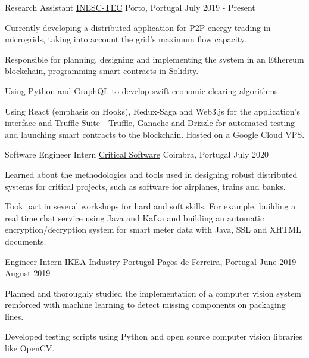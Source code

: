 
\begin{cventries}
  \cventry
    {Research Assistant} %
    {\href{https://www.inesctec.pt/en}{INESC-TEC}} %
    {Porto, Portugal} %
    {July 2019 - Present} %
    {
      \begin{cvitems} %
        \item {Currently developing a distributed application for P2P energy trading in microgrids, taking into account the grid's maximum flow capacity.}
        \item {Responsible for planning, designing and implementing the system in an Ethereum blockchain, programming smart contracts in Solidity.}
        \item {Using Python and GraphQL to develop swift economic clearing algorithms.}
        \item {Using React (emphasis on Hooks), Redux-Saga and Web3.js for the application's interface and Truffle Suite - Truffle, Ganache and Drizzle for automated testing and launching smart contracts to the blockchain. Hosted on a Google Cloud VPS.}
      \end{cvitems}
    }

  \cventry
    {Software Engineer Intern} %
    {\href{https://www.criticalsoftware.com/en}{Critical Software}} %
    {Coimbra, Portugal} %
    {July 2020} %
    {
      \begin{cvitems} %
        \item {Learned about the methodologies and tools used in designing robust distributed systems for critical projects, such as software for airplanes, trains and banks.}
        \item {Took part in several workshops for hard and soft skills. For example, building a real time chat service using Java and Kafka and building an automatic encryption/decryption system for smart meter data with Java, SSL and XHTML documents.}
      \end{cvitems}
    }

  \cventry
    {Engineer Intern} %
    {IKEA Industry Portugal} %
    {Paços de Ferreira, Portugal} %
    {June 2019 - August 2019} %
    {
      \begin{cvitems} %
        \item {Planned and thoroughly studied the implementation of a computer vision system reinforced with machine learning to detect missing components on packaging lines.}
        \item {Developed testing scripts using Python and open source computer vision libraries like OpenCV.}
      \end{cvitems}
    }


\end{cventries}
